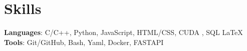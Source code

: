 
\section{Skills}
 \begin{itemize}[leftmargin=0.15in, label={}]
    \small{\item{
    
     \textbf{Languages}{: C/C++, Python, JavaScript, HTML/CSS, CUDA , SQL \LaTeX} \\
     
     \textbf{Tools}{: Git/GitHub, Bash, Yaml, Docker, FASTAPI }
     
     
     
    }}
 \end{itemize}


